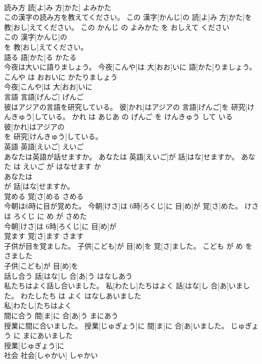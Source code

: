 \documentclass[8pt]{extreport}
\begin{document}
\begin{CJK}{UTF8}{min}
\\	読み方	読[よ]み 方[かた]	よみかた	
\\	この漢字の読み方を教えてください。	この 漢字[かんじ]の 読[よ]み 方[かた]を 教[おし]えてください。	この かんじ の よみかた を おしえて ください	
\\	この 漢字[かんじ]の
\\	を 教[おし]えてください。			
\\	語る	語[かた]る	かたる	
\\	今夜は大いに語りましょう。	今夜[こんや]は 大[おお]いに 語[かた]りましょう。	こんや は おおいに かたりましょう	
\\	今夜[こんや]は 大[おお]いに
\\	言語	言語[げんご]	げんご	
\\	彼はアジアの言語を研究している。	彼[かれ]はアジアの 言語[げんご]を 研究[けんきゅう]している。	かれ は あじあ の げんご を けんきゅう して いる	
\\	彼[かれ]はアジアの
\\	を 研究[けんきゅう]している。			
\\	英語	英語[えいご]	えいご	
\\	あなたは英語が話せますか。	あなたは 英語[えいご]が 話[はな]せますか。	あなた は えいご が はなせます か	
\\	あなたは
\\	が 話[はな]せますか。			
\\	覚める	覚[さ]める	さめる	
\\	今朝は6時に目が覚めた。	今朝[けさ]は 6時[ろくじ]に 目[め]が 覚[さ]めた。	けさ は ろくじ に め が さめた	
\\	今朝[けさ]は 6時[ろくじ]に 目[め]が
\\	覚ます	覚[さ]ます	さます	
\\	子供が目を覚ました。	子供[こども]が 目[め]を 覚[さ]ました。	こども が め を さました	
\\	子供[こども]が 目[め]を
\\	話し合う	話[はな]し 合[あ]う	はなしあう	
\\	私たちはよく話し合いました。	私[わたし]たちはよく 話[はな]し 合[あ]いました。	わたしたち は よく はなしあいました	
\\	私[わたし]たちはよく
\\	間に合う	間[ま]に 合[あ]う	まにあう	
\\	授業に間に合いました。	授業[じゅぎょう]に 間[ま]に 合[あ]いました。	じゅぎょう に まにあいました	
\\	授業[じゅぎょう]に
\\	社会	社会[しゃかい]	しゃかい	

\end{CJK}
\end{document}
